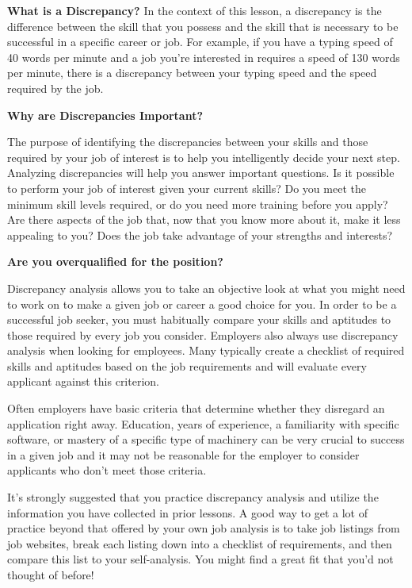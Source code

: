 \textbf{What is a Discrepancy?}
In the context of this lesson, a discrepancy is the difference between the skill that you possess and the skill that is necessary to be successful in a specific career or job. For example, if you have a typing speed of 40 words per minute and a job you're interested in requires a speed of 130 words per minute, there is a discrepancy between your typing speed and the speed required by the job.

\textbf{Why are Discrepancies Important?}

The purpose of identifying the discrepancies between your skills and those required by your job of interest is to help you intelligently decide your next step. Analyzing discrepancies will help you answer important questions. Is it possible to perform your job of interest given your current skills? Do you meet the minimum skill levels required, or do you need more training before you apply? Are there aspects of the job that, now that you know more about it, make it less appealing to you? Does the job take advantage of your strengths and interests? 

\textbf{Are you overqualified for the position?}

Discrepancy analysis allows you to take an objective look at what you might need to work on to make a given job or career a good choice for you. In order to be a successful job seeker, you must habitually compare your skills and aptitudes to those required by every job you consider.
Employers also always use discrepancy analysis when looking for employees. Many typically create a checklist of required skills and aptitudes based on the job requirements and will evaluate every applicant against this criterion.

Often employers have basic criteria that determine whether they disregard an application right away. Education, years of experience, a familiarity with specific software, or mastery of a specific type of machinery can be very crucial to success in a given job and it may not be reasonable for the employer to consider applicants who don't meet those criteria.

It's strongly suggested that you practice discrepancy analysis and utilize the information you have collected in prior lessons. A good way to get a lot of practice beyond that offered by your own job analysis is to take job listings from job websites, break each listing down into a checklist of requirements, and then compare this list to your self-analysis. You might find a great fit that you'd not thought of before!
 
